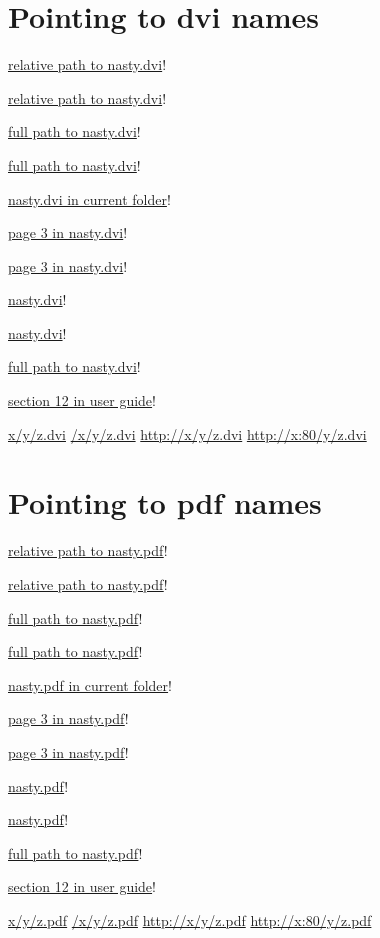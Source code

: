 \documentclass{article}
\begin{document}
\section{Pointing to dvi names}
\href{dvi::TeX-docs:nasty.dvi}{relative path to nasty.dvi}!\par
\href{:TeX-docs:nasty.dvi}{relative path to nasty.dvi}!\par
\href{HD:OzTeX:TeX-docs:nasty.dvi}{full path to nasty.dvi}!\par
\href{dvi:HD:OzTeX:TeX-docs:nasty.dvi}{full path to nasty.dvi}!\par
\href{dvi:nasty.dvi}{nasty.dvi in current folder}!\par
\href{dvi:nasty.dvi@3}{page 3 in nasty.dvi}!\par
\href{nasty.dvi@3}{page 3 in nasty.dvi}!\par
\href{nasty.dvi}{nasty.dvi}!\par
\href{file:nasty.dvi}{nasty.dvi}!\par
\href{file:HD:OzTeX:TeX-docs:nasty.dvi}{full path to nasty.dvi}!\par
\href{dvi:ozuser.dvi#section.12}{section 12 in user guide}!\par

\href{x/y/z.dvi}{x/y/z.dvi}
\href{/x/y/z.dvi}{/x/y/z.dvi}
\href{http://x/y/z.dvi}{http://x/y/z.dvi}
\href{http://x:80/y/z.dvi}{http://x:80/y/z.dvi}
\section{Pointing to pdf names}
\href{dvi::TeX-docs:nasty.pdf}{relative path to nasty.pdf}!\par
\href{:TeX-docs:nasty.pdf}{relative path to nasty.pdf}!\par
\href{HD:OzTeX:TeX-docs:nasty.pdf}{full path to nasty.pdf}!\par
\href{dvi:HD:OzTeX:TeX-docs:nasty.pdf}{full path to nasty.pdf}!\par
\href{dvi:nasty.pdf}{nasty.pdf in current folder}!\par
\href{dvi:nasty.pdf@3}{page 3 in nasty.pdf}!\par
\href{nasty.pdf@3}{page 3 in nasty.pdf}!\par
\href{nasty.pdf}{nasty.pdf}!\par
\href{file:nasty.pdf}{nasty.pdf}!\par
\href{file:HD:OzTeX:TeX-docs:nasty.pdf}{full path to nasty.pdf}!\par
\href{dvi:ozuser.pdf#section.12}{section 12 in user guide}!\par

\href{x/y/z.pdf}{x/y/z.pdf}
\href{/x/y/z.pdf}{/x/y/z.pdf}
\href{http://x/y/z.pdf}{http://x/y/z.pdf}
\href{http://x:80/y/z.pdf}{http://x:80/y/z.pdf}
\end{document}
